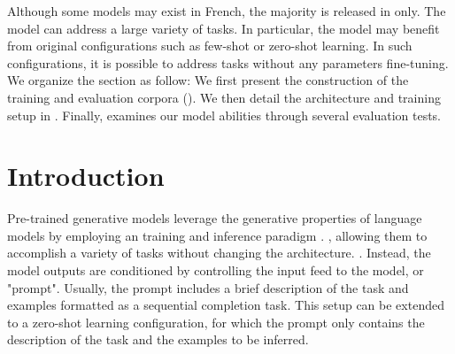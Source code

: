 Although some models may exist in French, the majority is released in  only. The model can address a large variety of tasks. In particular, the model may benefit from original configurations such as few-shot or zero-shot learning. In such configurations, it is possible to address tasks without any parameters fine-tuning. We organize the section as follow: We first present the construction of the training and evaluation corpora (). We then detail the architecture and training setup in . Finally,   examines our model abilities through several evaluation tests.



\section{Introduction}

Pre-trained generative models leverage the generative properties of language models by employing an  training and inference paradigm \parencite{radford_2018, radford_2019, brown_20}. , allowing them to accomplish a variety of tasks without changing the architecture. . Instead, the model outputs are conditioned by controlling the input feed to the model, or "prompt". Usually, the prompt includes a brief description of the task and examples formatted as a sequential completion task. This setup can be extended to a zero-shot learning configuration, for which the prompt only contains the description of the task and the examples to be inferred.

